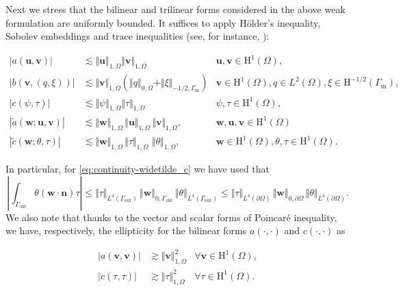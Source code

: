 \documentclass[onefignum,onetabnum,reqno,a4paper,final]{siamart250211}
\def\O{\Omega}
\newcommand\bu{\boldsymbol{u}}
\newcommand\bv{\boldsymbol{v}}
\newcommand\bn{\boldsymbol{n}}
\newcommand\bw{\boldsymbol{w}}
\newcommand\0{\mathbf{0}}
\renewcommand\H{\mathrm{H}}
\newcommand\bH{\boldsymbol{\mathrm{H}}}
\renewcommand\O{\Omega}
\newcommand\Gm{\Gamma_{\mathrm{m}}}
\newcommand\Go{\Gamma_{\mathrm{out}}}
\numberwithin{figure}{section}
\numberwithin{table}{section}
\begin{document}
Next we stress that the bilinear and trilinear forms considered in the above weak formulation are uniformly bounded. It suffices to apply  Hölder's inequality, Sobolev embeddings and trace inequalities (see, for instance, \cite[Section 1.1]{temam2001navier}):
\begin{linenomath}
	\begin{subequations}
		\begin{align}
			\label{eq:cont-a}   \vert a(\bu,\bv)\vert&\lesssim \Vert \bu\Vert_{1,\O}\Vert \bv\Vert_{1,\O}&\bu,\bv\in \bH^1(\O),\\
			\vert b(\bv,(q,\xi))\vert &\lesssim \Vert\bv\Vert_{1,\O}(\Vert q\Vert_{0,\O}+\Vert \xi\Vert_{-1/2,\Gm})&\bv\in\bH^1(\O),q\in L^2(\O),\xi\in \H^{-1/2}(\Gm),\label{eq:cont-b}\\
			\vert c(\psi,\tau)\vert&\lesssim \Vert \psi\Vert_{1,\O}\Vert \tau\Vert_{1,\O} &\psi,\tau\in \H^1(\O), \label{eq:cont-c}
			\\
			|\widetilde{a}(\bw;\bu,\bv)|&\lesssim \Vert\bw\Vert_{1,\Omega}\,\Vert\bu\Vert_{1,\Omega}\,\Vert\bv\Vert_{1,\Omega},&\bw,\bu,\bv\in \bH^1(\O)\label{eq:continuity-widetilde_a}\\
			|\widetilde{c}(\bw;\theta,\tau)|&\lesssim \Vert\bw\Vert_{1,\Omega}\,\Vert\tau\Vert_{1,\Omega}\, \,\Vert\theta\Vert_{1,\Omega},&\bw\in\bH^1(\O),\theta,\tau\in \H^1(\O)\label{eq:continuity-widetilde_c}.
\end{align}\end{subequations}\end{linenomath}
In particular, for \eqref{eq:continuity-widetilde_c} we have used that
$$
		\left|\int_{\Go}\theta(\bw\cdot\bn)\tau\right|\leq \Vert\tau\Vert_{L^4(\Go)}\, \Vert\bw\Vert_{0,\Go}\,\Vert\theta\Vert_{L^4(\Go)}\leq \Vert\tau\Vert_{L^4(\partial\Omega)}\, \Vert\bw\Vert_{0,\partial\Omega}\,\Vert\theta\Vert_{L^4(\partial\Omega)}.
$$
We also note that thanks to the vector and scalar forms of Poincar\'e inequality, we have, respectively, the ellipticity for the bilinear forms $a(\cdot,\cdot)$ and $c(\cdot,\cdot)$ as
\begin{linenomath}
	\begin{subequations}
		\begin{align}
			\label{eq:coer-a}    |a(\bv,\bv)|&\gtrsim \Vert \bv\Vert_{1,\O}^2&\forall\bv\in\bH^1(\O),\\
			\label{eq:coer-c}   |c(\tau,\tau)|&\gtrsim \Vert \tau\Vert_{1,\O}^2  &\forall\tau\in\H^1(\O).    
\end{align}\end{subequations}\end{linenomath}
\end{document}
